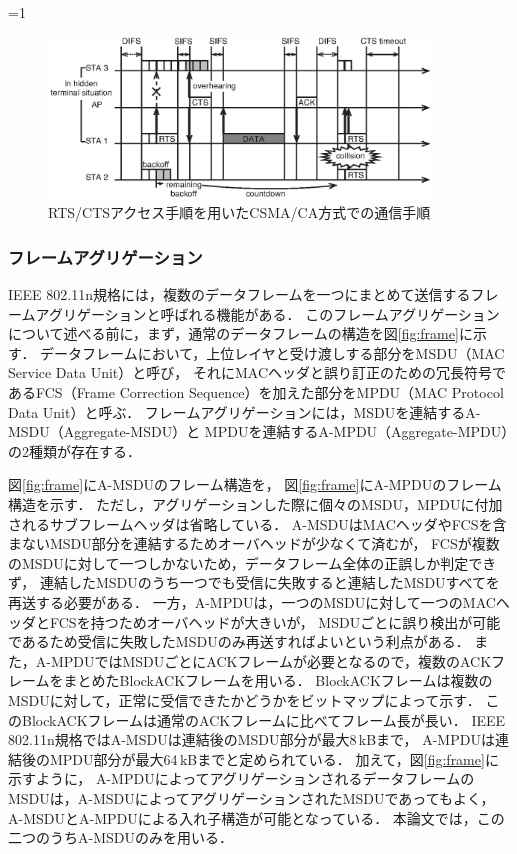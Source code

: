 \documentclass[master]{kuisthesis}		%
\newcounter{flagFig}
\begin{document}
			\ifnum\value{flagFig}=1 {\begin{figure}[htbp]
				\begin{center}
					\includegraphics[width=0.9\textwidth]{fig/rtscts2.eps}
					\caption{RTS/CTSアクセス手順を用いたCSMA/CA方式での通信手順}
					\label{fig:rtscts}
				\end{center}
			\end{figure}}\fi

		\subsubsection{フレームアグリゲーション}
			{IEEE} 802.11n規格には，複数のデータフレームを一つにまとめて送信するフレームアグリゲーションと呼ばれる機能がある\cite{stdn}．
			このフレームアグリゲーションについて述べる前に，まず，通常のデータフレームの構造を図\ref{fig:frame}に示す．
			データフレームにおいて，上位レイヤと受け渡しする部分をMSDU（MAC Service Data Unit）と呼び，
			それにMACヘッダと誤り訂正のための冗長符号であるFCS（Frame Correction Sequence）を加えた部分をMPDU（MAC Protocol Data Unit）と呼ぶ．
			フレームアグリゲーションには，MSDUを連結するA-MSDU（Aggregate-MSDU）と
			MPDUを連結するA-MPDU（Aggregate-MPDU）の2種類が存在する．

			\par
			図\ref{fig:frame}にA-MSDUのフレーム構造を，
			図\ref{fig:frame}にA-MPDUのフレーム構造を示す．
			ただし，アグリゲーションした際に個々のMSDU，MPDUに付加されるサブフレームヘッダは省略している．
			A-MSDUはMACヘッダやFCSを含まないMSDU部分を連結するためオーバヘッドが少なくて済むが，
			FCSが複数のMSDUに対して一つしかないため，データフレーム全体の正誤しか判定できず，
			連結したMSDUのうち一つでも受信に失敗すると連結したMSDUすべてを再送する必要がある．
			一方，A-MPDUは，一つのMSDUに対して一つのMACヘッダとFCSを持つためオーバヘッドが大きいが，
			MSDUごとに誤り検出が可能であるため受信に失敗したMSDUのみ再送すればよいという利点がある．
			また，A-MPDUではMSDUごとにACKフレームが必要となるので，複数のACKフレームをまとめたBlockACKフレームを用いる．
			BlockACKフレームは複数のMSDUに対して，正常に受信できたかどうかをビットマップによって示す．
			このBlockACKフレームは通常のACKフレームに比べてフレーム長が長い．
			IEEE 802.11n規格ではA-MSDUは連結後のMSDU部分が最大8\,kBまで，
			A-MPDUは連結後のMPDU部分が最大64\,kBまでと定められている\cite{stdn}．
			加えて，図\ref{fig:frame}に示すように，
			A-MPDUによってアグリゲーションされるデータフレームのMSDUは，A-MSDUによってアグリゲーションされたMSDUであってもよく，
			A-MSDUとA-MPDUによる入れ子構造が可能となっている．
			本論文では，この二つのうちA-MSDUのみを用いる．
\end{document}

